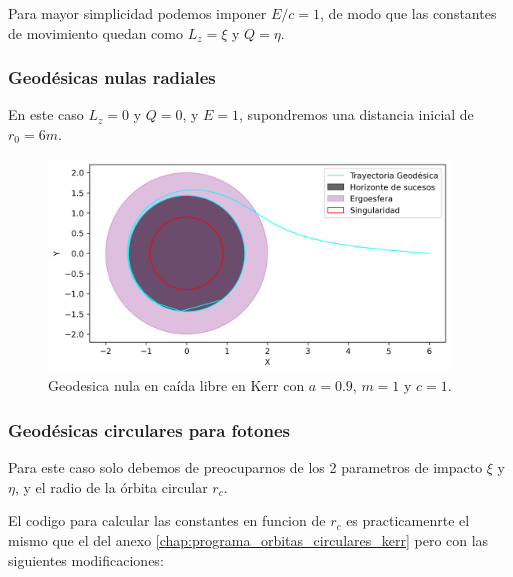 Para mayor simplicidad podemos imponer $E/c = 1$, de modo que las constantes de movimiento quedan como $L_z = \xi$ y $Q = \eta$.
\subsubsection{Geodésicas nulas radiales} 
En este caso $L_z = 0$ y $Q = 0$, y $E = 1$, supondremos una distancia inicial de $r_0 = 6m$.
\begin{figure}[H]
    \begin{small}
        \begin{center}
            \includegraphics[width=0.95\textwidth]{AgujerosNegros/kerr/geodesics_plots/geodesica_foton_caida_planoxy.png}
        \end{center}
        \caption{Geodesica nula en caída libre en Kerr con $a = 0.9$, $m=1$ y $c=1$.}
    \end{small}
\end{figure}

\subsubsection{Geodésicas circulares para fotones}
Para este caso solo debemos de preocuparnos de los 2 parametros de impacto $\xi$ y $\eta$, y el radio de la órbita circular $r_c$.

El codigo para calcular las constantes en funcion de $r_c$ es practicamenrte el mismo que el del anexo \ref{chap:programa_orbitas_circulares_kerr} pero con las siguientes modificaciones:


